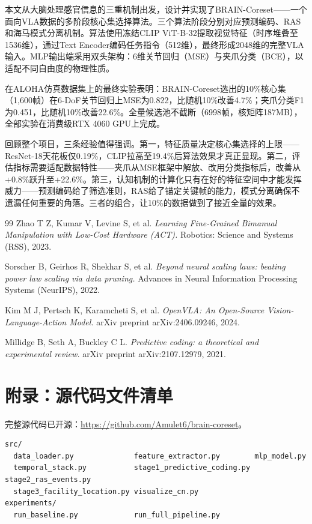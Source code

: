 \documentclass[11pt,a4paper,fontset=none]{ctexart}
\begin{document}
本文从大脑处理感官信息的三重机制出发，设计并实现了BRAIN-Coreset——一个面向VLA数据的多阶段核心集选择算法。三个算法阶段分别对应预测编码、RAS和海马模式分离机制。算法使用冻结CLIP ViT-B-32提取视觉特征（时序堆叠至1536维），通过Text Encoder编码任务指令（512维），最终形成2048维的完整VLA输入。MLP输出端采用双头架构：6维关节回归（MSE）与夹爪分类（BCE），以适配不同自由度的物理性质。

在ALOHA仿真数据集上的最终实验表明：BRAIN-Coreset选出的10\%核心集（1,600帧）在6-DoF关节回归上MSE为0.822，比随机10\%改善4.7\%；夹爪分类F1为0.451，比随机10\%改善22.6\%。全量候选池不截断（6998帧，核矩阵187MB），全部实验在消费级RTX 4060 GPU上完成。

回顾整个项目，三条经验值得强调。第一，特征质量决定核心集选择的上限——ResNet-18天花板仅0.19\%，CLIP拉高至19.4\%后算法效果才真正显现。第二，评估指标需要适配数据特性——夹爪从MSE框架中解放、改用分类指标后，改善从+0.8\%跃升至+22.6\%。第三，认知机制的计算化只有在好的特征空间中才能发挥威力——预测编码给了筛选准则，RAS给了锚定关键帧的能力，模式分离确保不遗漏任何重要的角落。三者的组合，让10\%的数据做到了接近全量的效果。

\begin{thebibliography}{99}
Zhao T Z, Kumar V, Levine S, et al. \textit{Learning Fine-Grained Bimanual Manipulation with Low-Cost Hardware (ACT).} Robotics: Science and Systems (RSS), 2023.

Sorscher B, Geirhos R, Shekhar S, et al. \textit{Beyond neural scaling laws: beating power law scaling via data pruning.} Advances in Neural Information Processing Systems (NeurIPS), 2022.

Kim M J, Pertsch K, Karamcheti S, et al. \textit{OpenVLA: An Open-Source Vision-Language-Action Model.} arXiv preprint arXiv:2406.09246, 2024.

Millidge B, Seth A, Buckley C L. \textit{Predictive coding: a theoretical and experimental review.} arXiv preprint arXiv:2107.12979, 2021.
\end{thebibliography}

\vspace{1em}
\section*{附录：源代码文件清单}

完整源代码已开源：\url{https://github.com/Amulet6/brain-coreset}。

\begin{verbatim}
src/
  data_loader.py              feature_extractor.py        mlp_model.py
  temporal_stack.py           stage1_predictive_coding.py  stage2_ras_events.py
  stage3_facility_location.py visualize_cn.py
experiments/
  run_baseline.py             run_full_pipeline.py
\end{verbatim}
\end{document}
